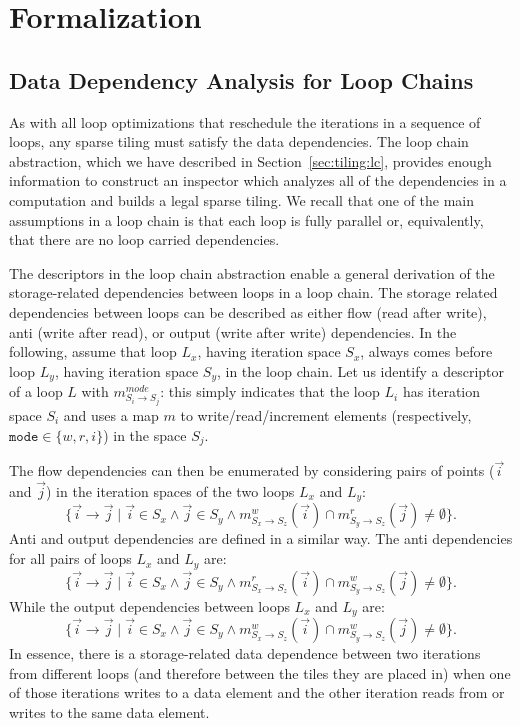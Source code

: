 

\section{Formalization}
\label{sec:tiling:algo}

\subsection{Data Dependency Analysis for Loop Chains}

As with all loop optimizations that reschedule the iterations in a sequence of loops, any sparse tiling must satisfy the data dependencies. The loop chain abstraction, which we have described in Section~\ref{sec:tiling:lc}, provides enough information to construct an inspector which analyzes all of the dependencies in a computation and builds a legal sparse tiling. We recall that one of the main assumptions in a loop chain is that each loop is fully parallel or, equivalently, that there are no loop carried dependencies.

The descriptors in the loop chain abstraction enable a general derivation of the storage-related dependencies between loops in a loop chain. The storage related dependencies between loops can be described as either flow (read after write), anti (write after read), or output (write after write) dependencies. In the following, assume that loop $L_x$, having iteration space $S_x$, always comes before loop $L_y$, having iteration space $S_y$, in the loop chain. Let us identify a descriptor of a loop $L$ with $m_{S_i \rightarrow S_j}^{mode}$: this simply indicates that the loop $L_i$ has iteration space $S_i$ and uses a map $m$ to write/read/increment elements (respectively, $\texttt{mode} \in \lbrace w, r, i\rbrace$) in the space $S_j$.

The flow dependencies can then be enumerated by considering pairs of points ($\vec{i}$ and $\vec{j}$) in the iteration spaces of the two loops $L_x$ and $L_y$:
\[
	\{ \vec{i} \rightarrow \vec{j} \; | \; \vec{i} \in S_x \wedge \vec{j} \in S_y \wedge 
	m_{S_x\rightarrow S_z}^{w}(\vec{i}) \cap m_{S_y \rightarrow S_z}^{r}(\vec{j}) \ne \emptyset \}.
\]
Anti and output dependencies are defined in a similar way. The anti dependencies for all pairs of loops $L_x$ and $L_y$ are:
\[
	\{ \vec{i} \rightarrow \vec{j} \; | \; \vec{i} \in S_x \wedge \vec{j} \in S_y \wedge 
	m_{S_x\rightarrow S_z}^{r}(\vec{i}) \cap m_{S_y \rightarrow S_z}^{w}(\vec{j}) \ne \emptyset \}.
\]
While the output dependencies between loops $L_x$ and $L_y$ are:
\[
	\{ \vec{i} \rightarrow \vec{j} \; | \; \vec{i} \in S_x \wedge \vec{j} \in S_y \wedge 
	m_{S_x\rightarrow S_z}^{w}(\vec{i}) \cap m_{S_y \rightarrow S_z}^{w}(\vec{j}) \ne \emptyset \}.
\]
In essence, there is a storage-related data dependence between two iterations from different loops (and therefore between the tiles they are placed in) when one of those iterations writes to a data element and the other iteration reads from or writes to the same data element.

